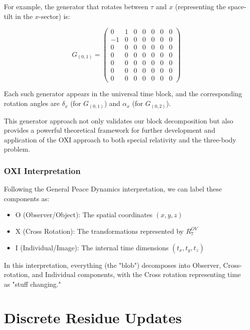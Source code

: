 \documentclass{article}
\begin{document}
For example, the generator that rotates between $\tau$ and $x$ (representing the space-tilt in the $x$-sector) is:

\begin{equation}
G_{(0,1)} = 
\begin{pmatrix}
0 & 1 & 0 & 0 & 0 & 0 & 0 \\
-1 & 0 & 0 & 0 & 0 & 0 & 0 \\
0 & 0 & 0 & 0 & 0 & 0 & 0 \\
0 & 0 & 0 & 0 & 0 & 0 & 0 \\
0 & 0 & 0 & 0 & 0 & 0 & 0 \\
0 & 0 & 0 & 0 & 0 & 0 & 0 \\
0 & 0 & 0 & 0 & 0 & 0 & 0
\end{pmatrix}
\end{equation}

Each such generator appears in the universal time block, and the corresponding rotation angles are $\delta_x$ (for $G_{(0,1)}$) and $\alpha_x$ (for $G_{(0,2)}$).

This generator approach not only validates our block decomposition but also provides a powerful theoretical framework for further development and application of the OXI approach to both special relativity and the three-body problem.

\subsubsection{OXI Interpretation}
Following the General Peace Dynamics interpretation, we can label these components as:

\begin{itemize}
\item O (Observer/Object): The spatial coordinates $(x, y, z)$
\item X (Cross Rotation): The transformations represented by $R^{OV}_7$ 
\item I (Individual/Image): The internal time dimensions $(t_x, t_y, t_z)$
\end{itemize}

In this interpretation, everything (the "blob") decomposes into Observer, Cross-rotation, and Individual components, with the Cross rotation representing time as "stuff changing."

\section{Discrete Residue Updates}
\end{document}
